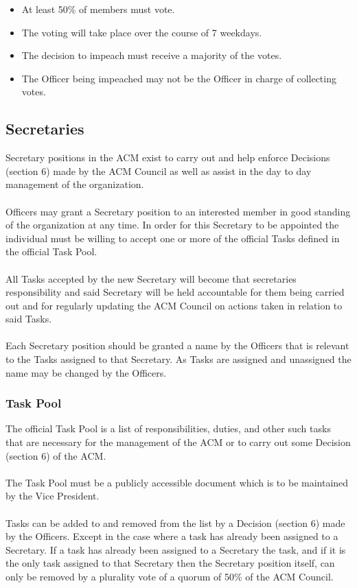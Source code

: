 \documentclass[12pt,titlepage]{article}
\begin{document}
\begin{itemize}
	\item At least 50\% of members must vote.
	\item The voting will take place over the course of 7 weekdays.
	\item The decision to impeach must receive a majority of the votes.
	\item The Officer being impeached may not be the Officer in charge of collecting votes.
\end{itemize}

\subsection{Secretaries}

Secretary positions in the ACM exist to carry out and help enforce Decisions (section 6) made by the ACM Council as well as assist in the day to day management of the organization.\\
\\
Officers may grant a Secretary position to an interested member in good standing of the organization at any time. In order for this Secretary to be appointed the individual must be willing to accept one or more of the official Tasks defined in the official Task Pool.\\
\\
All Tasks accepted by the new Secretary will become that secretaries responsibility and said Secretary will be held accountable for them being carried out and for regularly updating the ACM Council on actions taken in relation to said Tasks.\\
\\
Each Secretary position should be granted a name by the Officers that is relevant to the Tasks assigned to that Secretary. As Tasks are assigned and unassigned the name may be changed by the Officers.

\subsubsection{Task Pool}

The official Task Pool is a list of responsibilities, duties, and other such tasks that are necessary for the management of the ACM or to carry out some Decision (section 6) of the ACM.\\
\\
The Task Pool must be a publicly accessible document which is to be maintained by the Vice President.\\
\\
Tasks can be added to and removed from the list by a Decision (section 6) made by the Officers. Except in the case where a task has already been assigned to a Secretary. If a task has already been assigned to a Secretary the task, and if it is the only task assigned to that Secretary then the Secretary position itself, can only be removed by a plurality vote of a quorum of 50\% of the ACM Council.
\end{document}
